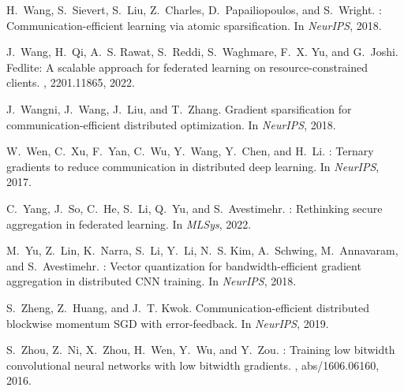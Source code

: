 \documentclass[11pt]{article}
\newcommand{\graham}[1]{{\color{green}Graham: #1}}
\begin{document}
\begin{thebibliography}{10}
\begin{small}
H.~Wang, S.~Sievert, S.~Liu, Z.~Charles, D.~Papailiopoulos, and S.~Wright.
: Communication-efficient learning via atomic sparsification.
\newblock In {\em NeurIPS}, 2018.

J.~Wang, H.~Qi, A.~S. Rawat, S.~Reddi, S.~Waghmare, F.~X. Yu, and G.~Joshi.
\newblock Fedlite: A scalable approach for federated learning on
  resource-constrained clients.
, 2201.11865, 2022.

J.~Wangni, J.~Wang, J.~Liu, and T.~Zhang.
\newblock Gradient sparsification for communication-efficient distributed
  optimization.
\newblock In {\em NeurIPS}, 2018.

W.~Wen, C.~Xu, F.~Yan, C.~Wu, Y.~Wang, Y.~Chen, and H.~Li.
: Ternary gradients to reduce communication in distributed
  deep learning.
\newblock In {\em NeurIPS}, 2017.

C.~Yang, J.~So, C.~He, S.~Li, Q.~Yu, and S.~Avestimehr.
: Rethinking secure aggregation in federated learning.
\newblock In {\em MLSys}, 2022.

M.~Yu, Z.~Lin, K.~Narra, S.~Li, Y.~Li, N.~S. Kim, A.~Schwing, M.~Annavaram, and
  S.~Avestimehr.
: Vector quantization for bandwidth-efficient gradient
  aggregation in distributed {CNN} training.
\newblock In {\em NeurIPS}, 2018.

S.~Zheng, Z.~Huang, and J.~T. Kwok.
\newblock Communication-efficient distributed blockwise momentum {SGD} with
  error-feedback.
\newblock In {\em NeurIPS}, 2019.

S.~Zhou, Z.~Ni, X.~Zhou, H.~Wen, Y.~Wu, and Y.~Zou.
: Training low bitwidth convolutional neural networks
  with low bitwidth gradients.
, abs/1606.06160, 2016.
\end{small}
\end{thebibliography}


%


\end{document}
